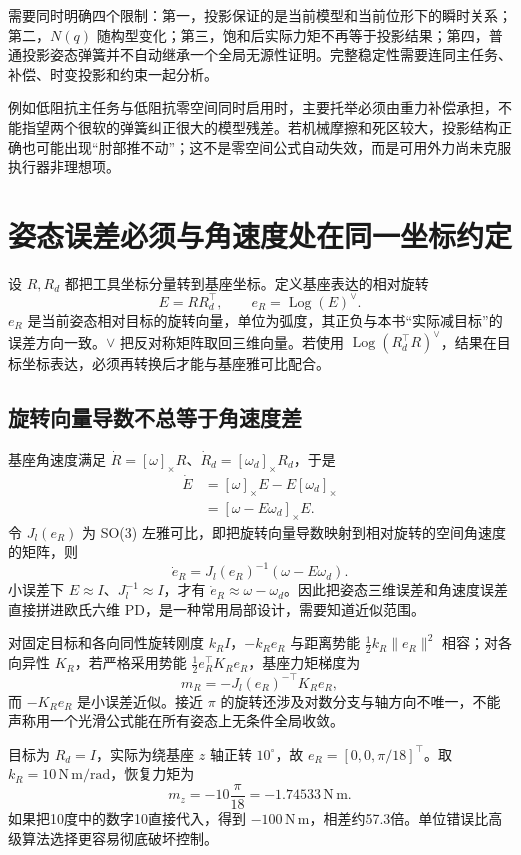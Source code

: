 需要同时明确四个限制：第一，投影保证的是当前模型和当前位形下的瞬时关系；第二，$N(q)$ 随构型变化；第三，饱和后实际力矩不再等于投影结果；第四，普通投影姿态弹簧并不自动继承一个全局无源性证明。完整稳定性需要连同主任务、补偿、时变投影和约束一起分析。

例如低阻抗主任务与低阻抗零空间同时启用时，主要托举必须由重力补偿承担，不能指望两个很软的弹簧纠正很大的模型残差。若机械摩擦和死区较大，投影结构正确也可能出现“肘部推不动”；这不是零空间公式自动失效，而是可用外力尚未克服执行器非理想项。

\section{姿态误差必须与角速度处在同一坐标约定}

设 $R,R_d$ 都把工具坐标分量转到基座坐标。定义基座表达的相对旋转
\[
E=RR_d^\top,\qquad e_R=\operatorname{Log}(E)^\vee.
\]
$e_R$ 是当前姿态相对目标的旋转向量，单位为弧度，其正负与本书“实际减目标”的误差方向一致。$\vee$ 把反对称矩阵取回三维向量。若使用 $\operatorname{Log}(R_d^\top R)^\vee$，结果在目标坐标表达，必须再转换后才能与基座雅可比配合。

\subsection{旋转向量导数不总等于角速度差}

基座角速度满足 $\dot R=[\omega]_\times R$、$\dot R_d=[\omega_d]_\times R_d$，于是
\begin{align}
\dot E&=[\omega]_\times E-E[\omega_d]_\times\\
&=[\omega-E\omega_d]_\times E.
\end{align}
令 $J_l(e_R)$ 为 SO(3) 左雅可比，即把旋转向量导数映射到相对旋转的空间角速度的矩阵，则
\begin{equation}
\dot e_R=J_l(e_R)^{-1}(\omega-E\omega_d).
\end{equation}
小误差下 $E\approx I$、$J_l^{-1}\approx I$，才有 $\dot e_R\approx\omega-\omega_d$。因此把姿态三维误差和角速度误差直接拼进欧氏六维 PD，是一种常用局部设计，需要知道近似范围。

对固定目标和各向同性旋转刚度 $k_RI$，$-k_Re_R$ 与距离势能 $\tfrac12k_R\|e_R\|^2$ 相容；对各向异性 $K_R$，若严格采用势能 $\tfrac12e_R^\top K_Re_R$，基座力矩梯度为
\[
m_R=-J_l(e_R)^{-\top}K_Re_R,
\]
而 $-K_Re_R$ 是小误差近似。接近 $\pi$ 的旋转还涉及对数分支与轴方向不唯一，不能声称用一个光滑公式能在所有姿态上无条件全局收敛。

\begin{examplebox}
目标为 $R_d=I$，实际为绕基座 $z$ 轴正转 $10^\circ$，故 $e_R=[0,0,\pi/18]^\top$。取 $k_R=10\,\mathrm{N\,m/rad}$，恢复力矩为
\[
m_z=-10\frac{\pi}{18}=-1.74533\,\mathrm{N\,m}.
\]
如果把10度中的数字10直接代入，得到 $-100\,\mathrm{N\,m}$，相差约57.3倍。单位错误比高级算法选择更容易彻底破坏控制。
\end{examplebox}

